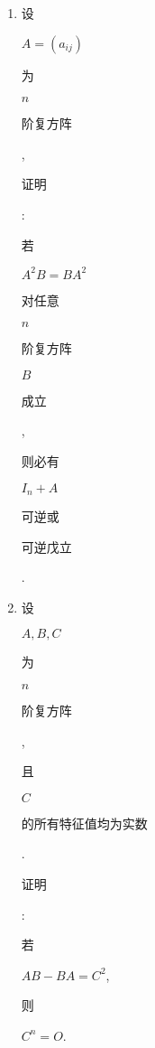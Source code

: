 \documentclass[10pt]{article}
\begin{document}
\begin{enumerate}
  \item \begin{CJK}{UTF8}{mj}设\end{CJK} $A=\left(a_{i j}\right)$ \begin{CJK}{UTF8}{mj}为\end{CJK} $n$ \begin{CJK}{UTF8}{mj}阶复方阵\end{CJK}, \begin{CJK}{UTF8}{mj}证明\end{CJK}: \begin{CJK}{UTF8}{mj}若\end{CJK} $A^{2} B=B A^{2}$ \begin{CJK}{UTF8}{mj}对任意\end{CJK} $n$ \begin{CJK}{UTF8}{mj}阶复方阵\end{CJK} $B$ \begin{CJK}{UTF8}{mj}成立\end{CJK}, \begin{CJK}{UTF8}{mj}则必有\end{CJK} $I_{n}+A$ \begin{CJK}{UTF8}{mj}可逆或\end{CJK} \begin{CJK}{UTF8}{mj}可逆戊立\end{CJK}.

  \item \begin{CJK}{UTF8}{mj}设\end{CJK} $A, B, C$ \begin{CJK}{UTF8}{mj}为\end{CJK} $n$ \begin{CJK}{UTF8}{mj}阶复方阵\end{CJK}, \begin{CJK}{UTF8}{mj}且\end{CJK} $C$ \begin{CJK}{UTF8}{mj}的所有特征值均为实数\end{CJK}.\begin{CJK}{UTF8}{mj}证明\end{CJK}: \begin{CJK}{UTF8}{mj}若\end{CJK} $A B-B A=C^{2}$, \begin{CJK}{UTF8}{mj}则\end{CJK} $C^{n}=O$.


\end{enumerate}
\end{document}
